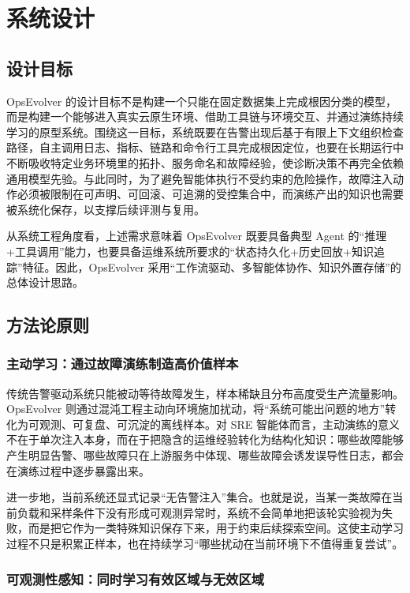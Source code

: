 \chapter{系统设计}
\label{cha:system_design}

\section{设计目标}
\label{sec:design_goals}

OpsEvolver 的设计目标不是构建一个只能在固定数据集上完成根因分类的模型，而是构建一个能够进入真实云原生环境、借助工具链与环境交互、并通过演练持续学习的原型系统。围绕这一目标，系统既要在告警出现后基于有限上下文组织检查路径，自主调用日志、指标、链路和命令行工具完成根因定位，也要在长期运行中不断吸收特定业务环境里的拓扑、服务命名和故障经验，使诊断决策不再完全依赖通用模型先验。与此同时，为了避免智能体执行不受约束的危险操作，故障注入动作必须被限制在可声明、可回滚、可追溯的受控集合中，而演练产出的知识也需要被系统化保存，以支撑后续评测与复用。

从系统工程角度看，上述需求意味着 OpsEvolver 既要具备典型 Agent 的“推理+工具调用”能力，也要具备运维系统所要求的“状态持久化+历史回放+知识追踪”特征。因此，OpsEvolver 采用“工作流驱动、多智能体协作、知识外置存储”的总体设计思路。

\section{方法论原则}
\label{sec:methodology_principles}

\subsection{主动学习：通过故障演练制造高价值样本}

传统告警驱动系统只能被动等待故障发生，样本稀缺且分布高度受生产流量影响。OpsEvolver 则通过混沌工程主动向环境施加扰动，将“系统可能出问题的地方”转化为可观测、可复盘、可沉淀的离线样本。对 SRE 智能体而言，主动演练的意义不在于单次注入本身，而在于把隐含的运维经验转化为结构化知识：哪些故障能够产生明显告警、哪些故障只在上游服务中体现、哪些故障会诱发误导性日志，都会在演练过程中逐步暴露出来。

进一步地，当前系统还显式记录“无告警注入”集合。也就是说，当某一类故障在当前负载和采样条件下没有形成可观测异常时，系统不会简单地把该轮实验视为失败，而是把它作为一类特殊知识保存下来，用于约束后续探索空间。这使主动学习过程不只是积累正样本，也在持续学习“哪些扰动在当前环境下不值得重复尝试”。

\subsection{可观测性感知：同时学习有效区域与无效区域}

